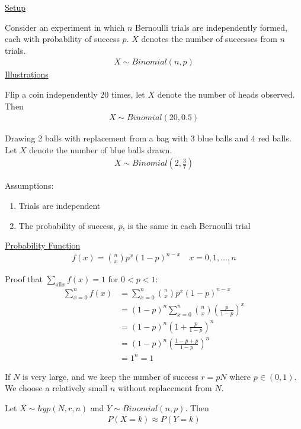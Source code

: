 \documentclass{article}
\begin{document}
\underline{Setup}

Consider an experiment in which $n$ Bernoulli trials are independently formed, each with probability of success $p$. $X$ denotes the number of successes from $n$ trials.
\begin{align*}
    X \sim Binomial(n,p)
\end{align*}
\underline{Illustrations}

Flip a coin independently 20 times, let $X$ denote the number of heads observed. Then
\begin{align*}
    X \sim Binomial(20,0.5)
\end{align*}

Drawing 2 balls with replacement from a bag with 3 blue balls and 4 red balls. Let $X$ denote the number of blue balls drawn. 
\begin{align*}
    X \sim Binomial(2,\frac{3}{7})
\end{align*}

Assumptions:
\begin{enumerate}
    \item Trials are independent
    \item The probability of success, $p$, is the same in each Bernoulli trial
\end{enumerate}


\underline{Probability Function}
\begin{align*}
    f(x) = \binom{n}{x}p^x(1-p)^{n-x} \quad x = 0,1,\ldots,n
\end{align*}

Proof that $\sum_{\text{all} x} f(x) = 1$ for $0 < p < 1$:
\begin{align*}
    \sum_{x=0}^nf(x) &= \sum_{x=0}^n\binom{n}{x}p^x(1-p)^{n-x}\\
    &= (1-p)^n \sum_{x=0}^n\binom{n}{x}\left(\frac{p}{1-p}\right)^x\\
    &= (1-p)^n \left(1 + \frac{p}{1-p}\right)^n \\
    &= (1-p)^n\left(\frac{1-p+p}{1-p}\right)^n \\
    &= 1^n = 1
\end{align*}


If $N$ is very large, and we keep the number of success $r = pN$ where $p \in (0,1)$. We choose a relatively small $n$ without replacement from $N$. 

Let $X \sim hyp(N,r,n)$ and $Y \sim Binomial(n,p)$. Then
\begin{align*}
    P(X = k) \approx P(Y=k)
\end{align*}
\end{document}
